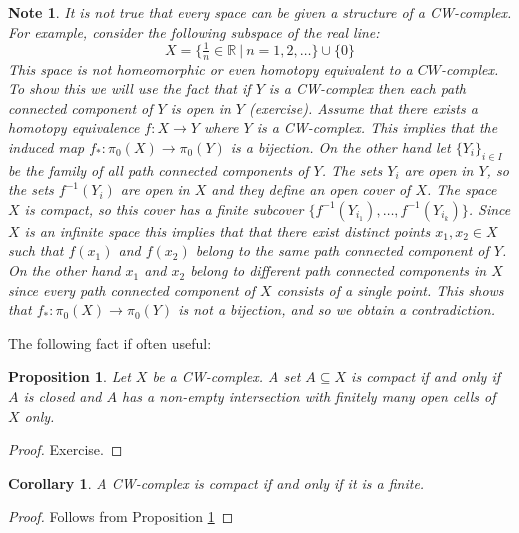 \documentclass[11pt, letterpaper, oneside]{report}
\theoremstyle{pplain}
\newtheorem{proposition}[theorem]{Proposition}
\newtheorem{corollary}[theorem]{Corollary}
\theoremstyle{ddefinition}
\newtheorem{note}[theorem]{Note}
\theoremstyle{nnn}
\theoremstyle{eexercise}
\newcommand{\R}{{\mathbb R}}
\begin{document}
\begin{note}
It is not true that every space can be given a structure of a CW-complex. 
For example, 
consider the following subspace of the real line:
$$X = \{\tfrac{1}{n} \in \R \ | \ n = 1, 2, \dots \} \cup \{0\}$$
This space is not homeomorphic or even homotopy equivalent to a $CW$-complex.
To show this we will use the fact that if $Y$ is a CW-complex then each path connected component of $Y$
is open in $Y$ (exercise). Assume  that there exists a homotopy equivalence $f\colon X \to Y$ where 
$Y$ is a CW-complex. This implies that the induced map $f_{\ast}\colon \pi_{0}(X) \to \pi_{0}(Y)$
is a bijection. On the other hand let $\{Y_{i}\}_{i\in I}$ be the family of all path connected components 
of $Y$. The sets $Y_{i}$ are open in $Y$, so the sets $f^{-1}(Y_{i})$ are open in $X$ 
and they define an open cover of $X$.  The space $X$ is compact, so this cover has a finite subcover 
$\{f^{-1}(Y_{i_{1}}), \dots, f^{-1}(Y_{i_{k}})\}$. Since $X$ is an infinite space this implies that that 
there exist distinct points  $x_{1}, x_{2}\in X$ such that $f(x_{1})$ and $f(x_{2})$
belong to the same path connected component of $Y$. On the other hand $x_{1}$ and $x_{2}$
belong to different path connected components in $X$ since every path connected component of $X$
consists of a single point. This shows that $f_{\ast}\colon \pi_{0}(X) \to \pi_{0}(Y)$ is not a bijection, 
and so we obtain a contradiction. 


\end{note}


The following fact if often useful: 


\begin{proposition}
\label{COMPACT CW COMPLEX PROP}
Let $X$ be a CW-complex. A set $A\subseteq X$ is compact if and only if $A$ is closed and $A$ has 
a non-empty intersection with  finitely many open cells of $X$ only.  
\end{proposition}

\begin{proof}
Exercise. 
\end{proof}


\begin{corollary}
\label{FINITE CW COMPACT COR}
A CW-complex is compact if and only if it is a finite. 
\end{corollary}


\begin{proof}
Follows from Proposition \ref{COMPACT CW COMPLEX PROP}
\end{proof}
\end{document}
